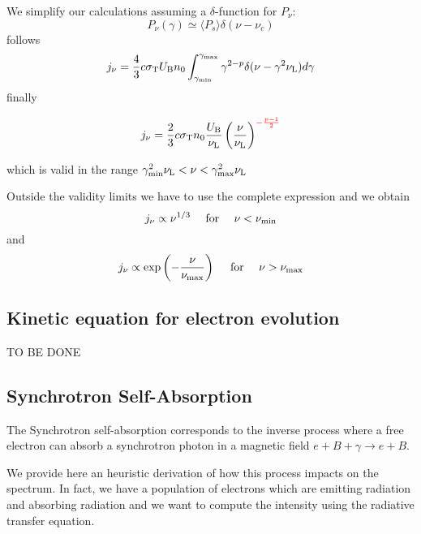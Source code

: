 We simplify our calculations assuming a $\delta$-function for $P_\nu$:
%
\begin{equation*}
P_\nu(\gamma) \simeq \langle P_s \rangle \delta(\nu - \nu_c)
\end{equation*}
%
follows
%
\begin{equation*}
j_\nu = \frac{4}{3} c \sigma_{\rm T} U_{\rm B} n_0 \int_{\gamma_{\rm min}}^{\gamma_{\rm max}} \gamma^{2-p} \delta(\nu - \gamma^2 \nu_{\rm L}) d\gamma
\end{equation*}
%
finally
%
\begin{remark}
\[ 
j_\nu = \frac{2}{3} c \sigma_{\rm T} n_0 \frac{U_{\rm B}}{\nu_{\rm L}} \left( \frac{\nu}{\nu_{\rm L}} \right)^{\color{red}-\frac{p-1}{2}}
\]
\end{remark}
%
which is valid in the range $\gamma^2_{\rm min} \nu_{\rm L} < \nu < \gamma^2_{\rm max} \nu_{\rm L}$


Outside the validity limits we have to use the complete expression and we obtain 
%
\begin{equation*}
j_\nu \propto \nu^{1/3} \quad\text{ for }\quad \nu < \nu_{\rm min}
\end{equation*}
%
and
%
\begin{equation*}
j_\nu \propto \exp \left(-\frac{\nu}{\nu_{\rm max}}\right) \quad\text{ for }\quad \nu > \nu_{\rm max}
\end{equation*}

\subsection{Kinetic equation for electron evolution}

TO BE DONE

\subsection{Synchrotron Self-Absorption}

The Synchrotron self-absorption corresponds to the inverse process where a free electron can absorb a synchrotron photon in a magnetic field $e+B+\gamma\rightarrow e+B$.

We provide here an heuristic derivation of how this process impacts on the spectrum. In fact, we have a population of electrons which are emitting radiation and absorbing radiation and we want to compute the intensity using the radiative transfer equation.

